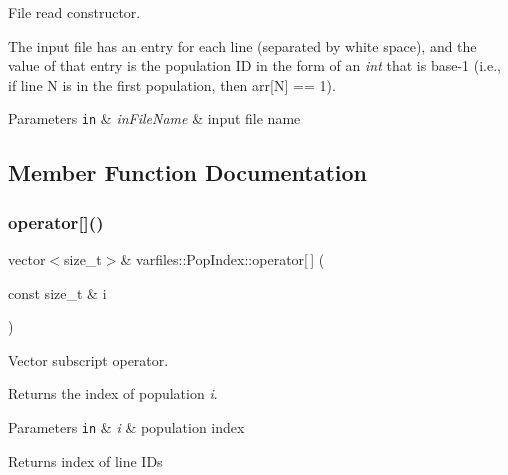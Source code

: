 File read constructor. 

The input file has an entry for each line (separated by white space), and the value of that entry is the population ID in the form of an {\itshape int} that is base-\/1 (i.\+e., if line N is in the first population, then {\ttfamily arr\mbox{[}N\mbox{]} == 1}).


\begin{DoxyParams}[1]{Parameters}
\mbox{\tt in}  & {\em in\+File\+Name} & input file name \\
\hline
\end{DoxyParams}


\subsection{Member Function Documentation}
\mbox{\label{classvarfiles_1_1_pop_index_a0ed15441299f7745efb8299cf1c33407}} 
\subsubsection{\texorpdfstring{operator[]()}{operator[]()}\hspace{0.1cm}{\footnotesize\ttfamily [1/2]}}
{\footnotesize\ttfamily vector$<$size\+\_\+t$>$\& varfiles\+::\+Pop\+Index\+::operator\mbox{[}$\,$\mbox{]} (\begin{DoxyParamCaption}\item[{const size\+\_\+t \&}]{i }\end{DoxyParamCaption})\hspace{0.3cm}{\ttfamily [inline]}}



Vector subscript operator. 

Returns the index of population {\itshape i}.


\begin{DoxyParams}[1]{Parameters}
\mbox{\tt in}  & {\em i} & population index \\
\hline
\end{DoxyParams}
\begin{DoxyReturn}{Returns}
index of line I\+Ds 
\end{DoxyReturn}
\mbox{\label{classvarfiles_1_1_pop_index_a017523f67cee8c42cf0f51ea21a5aebf}} 
